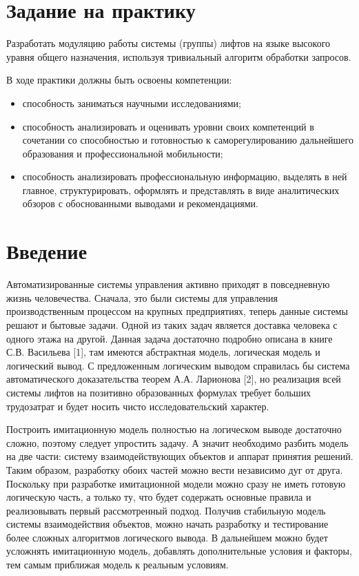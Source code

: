 \section{Задание на практику}
	Разработать модуляцию работы системы (группы) лифтов на языке высокого уравня общего назначения,
		используя тривиальный алгоритм обработки запросов.

	В ходе практики должны быть освоены компетенции:
		\begin{itemize}
			\item способность заниматься научными исследованиями;
			\item способность анализировать и оценивать уровни своих компетенций в сочетании со способностью и готовностью к саморегулированию дальнейшего образования и профессиональной мобильности;
			\item  способность анализировать профессиональную информацию, выделять в ней главное, структурировать, оформлять и представлять в виде аналитических обзоров с обоснованными выводами и рекомендациями.
		\end{itemize}

\newpage
\section{Введение}

Автоматизированные системы управления активно приходят в повседневную жизнь человечества. Сначала, это были системы для управления производственным процессом на крупных предприятиях, теперь данные системы решают и бытовые задачи. Одной из таких задач является доставка человека с одного этажа на другой. Данная задача достаточно подробно описана в книге С.В. Васильева [1], там имеются абстрактная модель, логическая модель и логический вывод. С предложенным логическим выводом справилась бы система автоматического доказательства теорем А.А. Ларионова [2], но реализация всей системы лифтов на позитивно образованных формулах требует больших трудозатрат и будет носить чисто исследовательский характер.

Построить имитационную модель полностью на логическом выводе достаточно сложно, поэтому следует упростить задачу. А значит необходимо разбить модель на две части: систему взаимодействующих объектов и аппарат принятия решений. Таким образом, разработку обоих частей можно вести независимо дуг от друга. Поскольку при разработке имитационной модели можно сразу не иметь готовую логическую часть, а только ту, что будет содержать основные правила и реализовывать первый рассмотренный подход. Получив стабильную модель системы взаимодействия объектов, можно начать разработку и тестирование более сложных алгоритмов логического вывода. В дальнейшем можно будет усложнять имитационную модель, добавлять дополнительные условия и факторы, тем самым приближая модель к реальным условиям.

